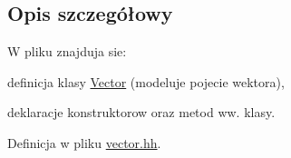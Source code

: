 \subsection{Opis szczegółowy}
W pliku znajduja sie\-:
\begin{DoxyItemize}
\item definicja klasy \hyperlink{class_vector}{Vector} (modeluje pojecie wektora),
\item deklaracje konstruktorow oraz metod ww. klasy. 
\end{DoxyItemize}

Definicja w pliku \hyperlink{vector_8hh_source}{vector.\-hh}.

